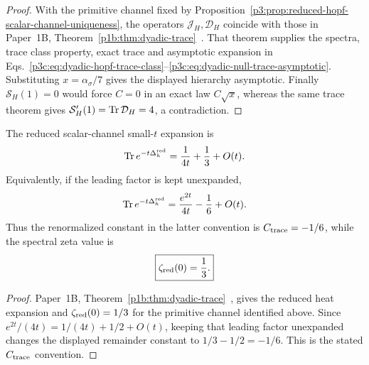 \documentclass[12pt,a4paper]{article}
\begin{document}
\begin{proof}
With the primitive channel fixed by
Proposition~\ref{p3:prop:reduced-hopf-scalar-channel-uniqueness}, the
operators \(\mathcal J_H,\mathcal D_H\) coincide with those in
Paper~1B, Theorem~\ref{p1b:thm:dyadic-trace}~\cite{Kugelmann2026Paper1B}.
That theorem supplies the spectra, trace class property, exact trace and
asymptotic expansion in
Eqs.~\eqref{p3c:eq:dyadic-hopf-trace-class}--\eqref{p3c:eq:dyadic-null-trace-asymptotic}.
Substituting \(x=\alpha_\sigma/7\) gives the displayed hierarchy asymptotic.
Finally \(\mathcal S_H(1)=0\) would force \(C=0\) in an exact law
\(C\sqrt x\), whereas the same trace theorem gives
\(\mathcal S_H'(1)=\operatorname{Tr}\mathcal D_H=4\), a contradiction.
\end{proof}

\begin{theorem}
\label{p3:thm:hopf-trace-constant}
The reduced scalar-channel small-\(t\) expansion is
\begin{equation}
 \operatorname{Tr} e^{-t\Delta_h^{\rm red}}
 =\frac{1}{4t}+\frac13+O(t).
\end{equation}
Equivalently, if the leading factor is kept unexpanded,
\[
 \operatorname{Tr} e^{-t\Delta_h^{\rm red}}
 =\frac{e^{2t}}{4t}-\frac16+O(t).
\]
Thus the renormalized constant in the latter convention is
\(C_{\rm trace}=-1/6\), while the spectral zeta value is
\begin{equation}
\label{p3:eq:zeta-red-zero}
 \boxed{\zeta_{\rm red}(0)=\frac13.}
\end{equation}
\end{theorem}

\begin{proof}
Paper~1B, Theorem~\ref{p1b:thm:dyadic-trace}~\cite{Kugelmann2026Paper1B},
gives the reduced heat expansion and \(\zeta_{\rm red}(0)=1/3\) for the
primitive channel identified above.  Since
\(e^{2t}/(4t)=1/(4t)+1/2+O(t)\), keeping that leading factor
unexpanded changes the displayed remainder constant to
\(1/3-1/2=-1/6\).  This is the stated \(C_{\rm trace}\) convention.
\end{proof}
\end{document}
